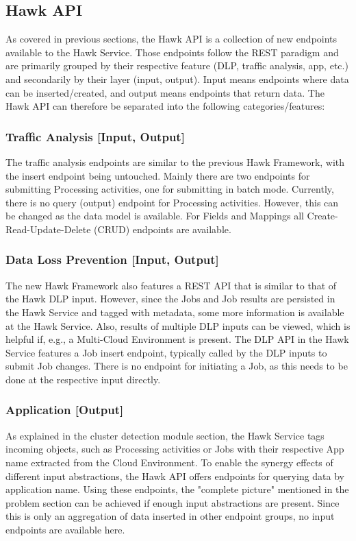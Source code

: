 \subsection{Hawk API}
As covered in previous sections, the Hawk API is a collection of new endpoints available to the Hawk Service.
Those endpoints follow the REST paradigm and are primarily grouped by their respective feature (DLP, traffic analysis, app, etc.) and secondarily by their layer (input, output). Input means endpoints where data can be inserted/created, and output means endpoints that return data. The Hawk API can therefore be separated into the following categories/features:

\subsubsection{Traffic Analysis [Input, Output]}
The traffic analysis endpoints are similar to the previous Hawk Framework, with the insert endpoint being untouched. Mainly there are two endpoints for submitting Processing activities, one for submitting in batch mode. Currently, there is no query (output) endpoint for Processing activities. However, this can be changed as the data model is available. For Fields and Mappings all Create-Read-Update-Delete (CRUD) endpoints are available.


\subsubsection{Data Loss Prevention [Input, Output]}
The new Hawk Framework also features a REST API that is similar to that of the Hawk DLP input. However, since the Jobs and Job results are persisted in the Hawk Service and tagged with metadata, some more information is available at the Hawk Service. Also, results of multiple DLP inputs can be viewed, which is helpful if, e.g., a Multi-Cloud Environment is present. The DLP API in the Hawk Service features a Job insert endpoint, typically called by the DLP inputs to submit Job changes. There is no endpoint for initiating a Job, as this needs to be done at the respective input directly.

\subsubsection{Application [Output]}
As explained in the cluster detection module section, the Hawk Service tags incoming objects, such as Processing activities or Jobs with their respective App name extracted from the Cloud Environment. To enable the synergy effects of different input abstractions, the Hawk API offers endpoints for querying data by application name. Using these endpoints, the "complete picture" mentioned in the problem section can be achieved if enough input abstractions are present. Since this is only an aggregation of data inserted in other endpoint groups, no input endpoints are available here.

